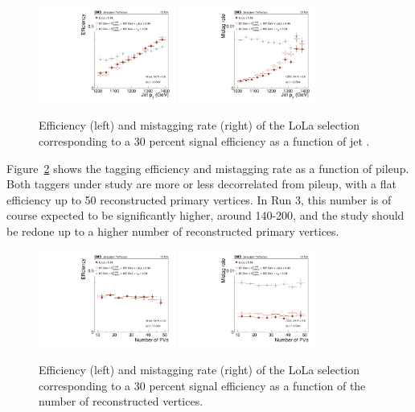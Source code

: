\begin{figure}[h!]
\centering
\includegraphics[width=0.4\textwidth]{figures/vtagging/AN-18-099/validation/WtagSigEffvsjpt.pdf}
\includegraphics[width=0.4\textwidth]{figures/vtagging/AN-18-099/validation/QCDMistagvsjpt.pdf}
\caption{Efficiency (left) and mistagging rate (right) of the LoLa selection corresponding to a 30 percent signal efficiency as a function of jet \PT.}
\label{fig:lola:eff_val_pt}
\end{figure}
Figure~\ref{fig:lola:eff_val_pu} shows the tagging efficiency and mistagging rate as a function of pileup. Both taggers under study are more or less decorrelated from pileup, with a flat efficiency up to 50 reconstructed primary vertices. In Run 3, this number is of course expected to be significantly higher, around 140-200, and the study should be redone up to a higher number of reconstructed primary vertices.
\begin{figure}[h!]
\centering
\includegraphics[width=0.4\textwidth]{figures/vtagging/AN-18-099/validation/WtagSigEffvsnPV.pdf}
\includegraphics[width=0.4\textwidth]{figures/vtagging/AN-18-099/validation/QCDMistagvsnPV.pdf}
\caption{Efficiency (left) and mistagging rate (right) of the LoLa selection corresponding to a 30 percent signal efficiency as a function of the number of reconstructed vertices.}
\label{fig:lola:eff_val_pu}
\end{figure}
\clearpage
